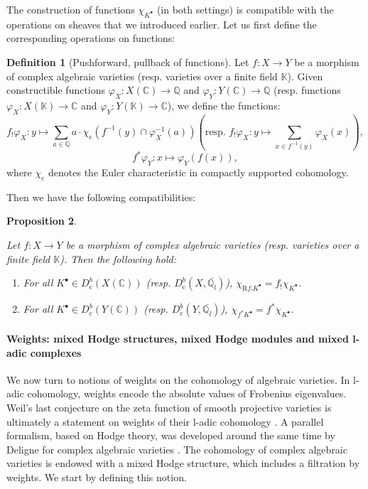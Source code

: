 \documentclass[11pt,english]{article}
\numberwithin{equation}{section}
\numberwithin{figure}{section}
\theoremstyle{definition}
\newtheorem{df}{Definition}[subsection]
\theoremstyle{plain}
\newtheorem{prop}[df]{Proposition}
\theoremstyle{remark}
\newcommand\QQ{\mathbb{Q}}
\newcommand\KK{\mathbb{K}}
\newcommand\CC{\mathbb{C}}
\begin{document}
The construction of functions $\chi_{K^{\bullet}}$ (in both settings)
is compatible with the operations on sheaves that we introduced earlier.
Let us first define the corresponding operations on functions:

\begin{df}[Pushforward, pullback of functions]

Let $f:X\rightarrow Y$ be a morphism of complex algebraic varieties
(resp. varieties over a finite field $\KK$). Given constructible
functions $\varphi_{X}:X(\CC)\rightarrow\QQ$ and $\varphi_{Y}:Y(\CC)\rightarrow\QQ$
(resp. functions $\varphi_{X}:X(\KK)\rightarrow\CC$ and $\varphi_{Y}:Y(\KK)\rightarrow\CC$),
we define the functions:\[
f_!\varphi_X:y\mapsto\sum_{a\in\QQ}a\cdot\chi_{\mathrm{c}}(f^{-1}(y)\cap\varphi_X^{-1}(a))
\left(
\text{resp. }
f_!\varphi_X:y\mapsto\sum_{x\in f^{-1}(y)}\varphi_X(x)
\right)
,
\]
\[
f^*\varphi_Y:x\mapsto\varphi_Y(f(x)),
\] where $\chi_{\mathrm{c}}$ denotes the Euler characteristic in compactly
supported cohomology.

\end{df}

Then we have the following compatibilities:

\begin{prop}{\cite[Thm. 4.1.22, Prop. 4.1.33.]{Dim04}\cite[Thm. 12.1.]{KW01}}

Let $f:X\rightarrow Y$ be a morphism of complex algebraic varieties
(resp. varieties over a finite field $\KK$). Then the following hold:
\begin{enumerate}
\item For all $K^{\bullet}\in D_{\mathrm{c}}^{b}(X(\CC))$ (resp. $D_{\mathrm{c}}^{b}(X,\bar{\QQ_{l}})$),
$\chi_{\mathrm{R}f_{!}K^{\bullet}}=f_{!}\chi_{K^{\bullet}}$.
\item For all $K^{\bullet}\in D_{\mathrm{c}}^{b}(Y(\CC))$ (resp. $D_{\mathrm{c}}^{b}(Y,\bar{\QQ_{l}})$),
$\chi_{f^{*}K^{\bullet}}=f^{*}\chi_{K^{\bullet}}$.
\end{enumerate}
\end{prop}

\paragraph*{Weights: mixed Hodge structures, mixed Hodge modules and mixed l-adic
complexes}

We now turn to notions of weights on the cohomology of algebraic varieties.
In l-adic cohomology, weights encode the absolute values of Frobenius
eigenvalues. Weil's last conjecture on the zeta function of smooth
projective varieties is ultimately a statement on weights of their
l-adic cohomology \cite{Del74b}. A parallel formalism, based on Hodge
theory, was developed around the same time by Deligne for complex
algebraic varieties \cite{Del70,Del71,Del74a}. The cohomology of
complex algebraic varieties is endowed with a mixed Hodge structure,
which includes a filtration by weights. We start by defining this
notion.
\end{document}
